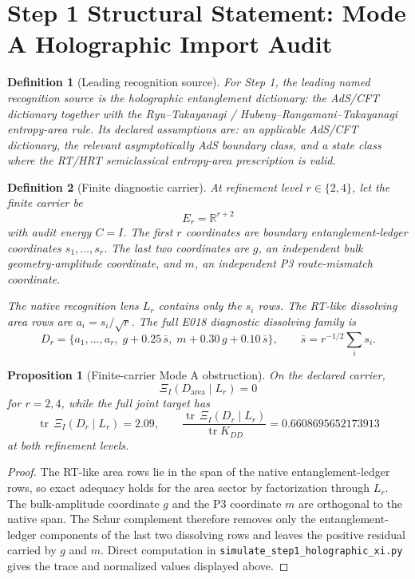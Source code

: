 \documentclass[11pt]{article}
\newtheorem{proposition}{Proposition}
\newtheorem{definition}{Definition}
\DeclareMathOperator{\tr}{tr}
\begin{document}
\section*{Step 1 Structural Statement: Mode A Holographic Import Audit}

\begin{definition}[Leading recognition source]
For Step 1, the leading named recognition source is the holographic
entanglement dictionary: the AdS/CFT dictionary together with the
Ryu--Takayanagi / Hubeny--Rangamani--Takayanagi entropy-area rule.
Its declared assumptions are: an applicable AdS/CFT dictionary, the relevant
asymptotically AdS boundary class, and a state class where the RT/HRT
semiclassical entropy-area prescription is valid.
\end{definition}

\begin{definition}[Finite diagnostic carrier]
At refinement level \(r\in\{2,4\}\), let the finite carrier be
\[
  E_r=\mathbb{R}^{r+2}
\]
with audit energy \(C=I\).  The first \(r\) coordinates are boundary
entanglement-ledger coordinates \(s_1,\ldots,s_r\).  The last two coordinates
are \(g\), an independent bulk geometry-amplitude coordinate, and \(m\), an
independent P3 route-mismatch coordinate.

The native recognition lens \(L_r\) contains only the \(s_i\) rows.  The
RT-like dissolving area rows are \(a_i=s_i/\sqrt r\).  The full E018 diagnostic
dissolving family is
\[
  D_r=\{a_1,\ldots,a_r,\; g+0.25\,\bar s,\; m+0.30\,g+0.10\,\bar s\},
  \qquad
  \bar s=r^{-1/2}\sum_i s_i .
\]
\end{definition}

\begin{proposition}[Finite-carrier Mode A obstruction]
On the declared carrier,
\[
  \Xi_I(D_{\mathrm{area}}\mid L_r)=0
\]
for \(r=2,4\), while the full joint target has
\[
  \tr\,\Xi_I(D_r\mid L_r)=2.09,
  \qquad
  \frac{\tr\,\Xi_I(D_r\mid L_r)}{\tr K_{DD}}=0.6608695652173913
\]
at both refinement levels.
\end{proposition}

\begin{proof}
The RT-like area rows lie in the span of the native entanglement-ledger rows,
so exact adequacy holds for the area sector by factorization through \(L_r\).
The bulk-amplitude coordinate \(g\) and the P3 coordinate \(m\) are orthogonal
to the native span.  The Schur complement therefore removes only the
entanglement-ledger components of the last two dissolving rows and leaves the
positive residual carried by \(g\) and \(m\).  Direct computation in
\texttt{simulate\_step1\_holographic\_xi.py} gives the trace and normalized
values displayed above.
\end{proof}
\end{document}
